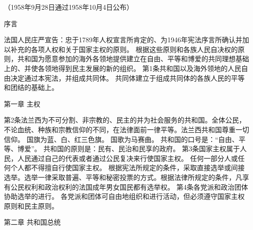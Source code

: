 （1958年9月28日通过1958年10月4日公布）
 
                                 序言
 
    法国人民庄严宣告：忠于1789年人权宣言所肯定的、为1946年宪法序言所确认并加以补充的各项人权和关于国家主权的原则。
    根据这些原则和各族人民自决权的原则，共和国为愿意参加的海外各领地提供建立在自由、平等和博爱的共同理想基础上的、并使各领地得到民主发展的新的组织。
    第1条共和国以及海外领地的人民自由决定通过本宪法，并组成共同体。
    共同体建立于组成共同体的各族人民的平等和团结的基础上。
 
                             第一章    主权
 
    第2条法兰西为不可分割、非宗教的、民主的并为社会服务的共和国。全体公民，不论血统、种族和宗教信仰的不同，在法律面前一律平等。法兰西共和国尊重一切信仰。
    国旗为蓝、白、红三色旗。
    国歌为马赛曲。
    共和国的口号是：“自由、平等、博爱”。
    共和国的原则是：民有、民治和民享的政府。
    第3条国家主权属于人民，人民通过自己的代表或者通过公民复决来行使国家主权。
    任何一部分人或任何个人都不得擅自行使国家主权。
    根据宪法所规定的条件，采取直接选举或间接选举。选举一律采取普遍、平等和秘密投票的方式。根据法律所规定的条件，凡享有公民权利和政治权利的法国成年男女国民都有选举权。
    第4条各党派和政治团体协助选举的进行。
    各党派和团体可自由地组织和进行活动，但必须遵守国家主权原则和民主原则。
 
                             第二章    共和国总统
 
